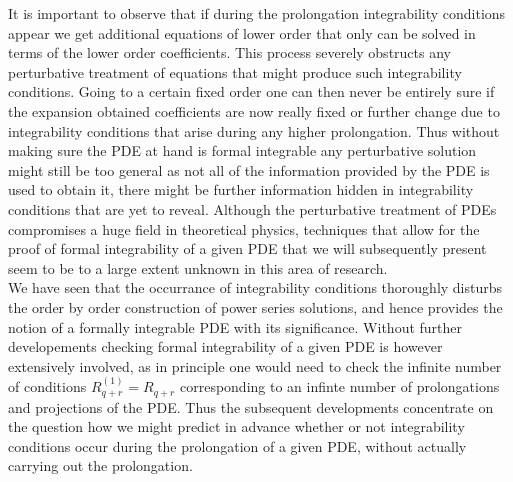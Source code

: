 \documentclass[a4paper,12pt, DIV=14, BCOR=5mm, twoside, headsepline, numbers=noenddot]{scrbook}
\begin{document}
It is important to observe that if during the prolongation integrability conditions appear we get additional equations of lower order that only can be solved in terms of the lower order coefficients. This process severely obstructs any perturbative treatment of equations that might produce such integrability conditions. Going to a certain fixed order one can then never be entirely sure if the expansion obtained coefficients are now really fixed or further change due to integrability conditions that arise during any higher prolongation.  Thus without making sure the PDE at hand is formal integrable any perturbative solution might still be too general as not all of the information provided by the PDE is used to obtain it, there might be further information hidden in integrability conditions that are yet to reveal. Although the perturbative treatment of PDEs compromises a huge field in theoretical physics, techniques that allow for the proof of formal integrability of a given PDE that we will subsequently present seem to be to a large extent unknown in this area of research. \\

We have seen that the occurrance of integrability conditions thoroughly disturbs the order by order construction of power series solutions, and hence provides the notion of a formally integrable PDE with its significance. Without further developements checking formal integrability of a given PDE is however extensively involved, as in principle one would need to check the infinite number of conditions $R_{q+r}^{(1)} = R_{q+r}$ corresponding to an infinte number of prolongations and projections of the PDE. Thus the subsequent developments concentrate on the question how we might predict in advance whether or not integrability conditions occur during the prolongation of a given PDE, without actually carrying out the prolongation.
\end{document}
